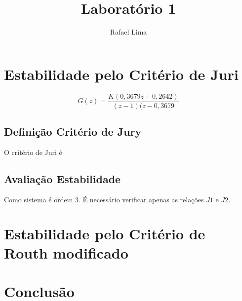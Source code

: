 \documentclass[a4paper,11pt]{article}
\title{Laboratório 1} %
\author{Rafael Lima}
\begin{document}

\section{Estabilidade pelo Critério de Juri}

\begin{equation}
G(z) = \frac{K(0,3679z + 0,2642)}{(z-1)(z-0,3679}
\end{equation}

\subsection{Definição Critério de Jury}

O critério de Juri é 

\subsection{Avaliação Estabilidade}

Como sistema é ordem 3. É necessário verificar apenas as relações $J1$ e $J2$.

\section{Estabilidade pelo Critério de Routh modificado}


\section{Conclusão}






\end{document}
